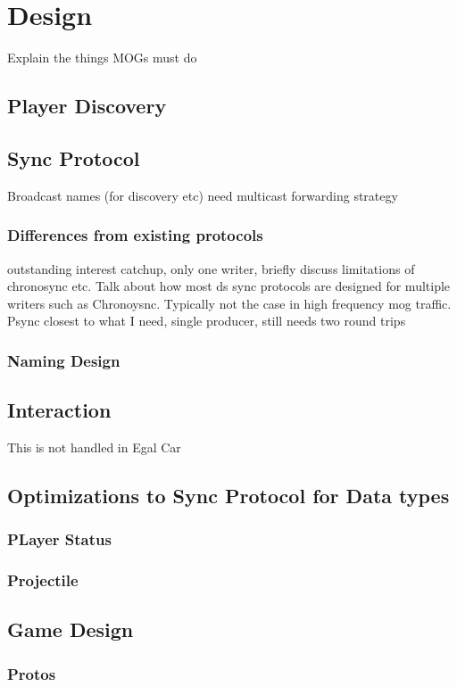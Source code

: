 \chapter{Design}
Explain the things MOGs must do 

\section{Player Discovery}

\section{Sync Protocol}
Broadcast names (for discovery etc) need multicast forwarding strategy
\subsection{Differences from existing protocols}
outstanding interest catchup, only one writer, briefly discuss limitations of chronosync etc. Talk about how most ds sync protocols are designed for multiple writers such as Chronoysnc. Typically not the case in high frequency mog traffic. Psync closest to what I need, single producer, still needs two round trips
\subsection{Naming Design}

\section{Interaction}
This is not handled in Egal Car

\section{Optimizations to Sync Protocol for Data types}
\subsection{PLayer Status}
\subsection{Projectile}

\section{Game Design}
\subsection{Protos}

